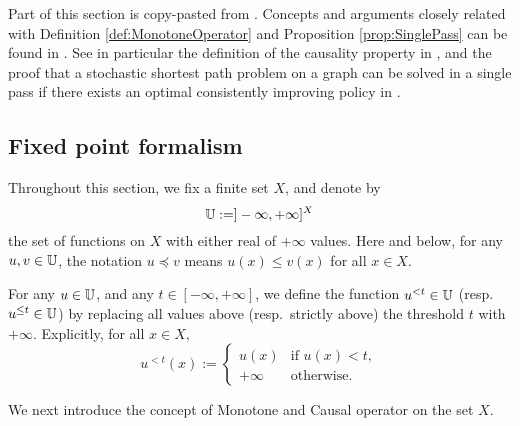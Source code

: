 
Part of this section is copy-pasted from \cite[Appendix A]{mirebeau2019riemannian}.
Concepts and arguments closely related with Definition \ref{def:MonotoneOperator} and Proposition \ref{prop:SinglePass} can be found in \cite{Tsitsiklis:1995EfficientTrajectories, Kimmel:1998Manifold,Sethian2003OUM,bertsekas1995dynamic}. See in particular the definition of the causality property in \cite{Sethian2003OUM}, and the proof that a stochastic shortest path problem on a graph can be solved in a single pass if there exists an optimal consistently improving policy in \cite[chapter 2]{bertsekas1995dynamic}.


\subsection{Fixed point formalism}

Throughout this section, we fix a finite set $X$, and denote by
\begin{equation*}
	\mathbb{U} := ]-\infty,+\infty]^X
\end{equation*}
the set of functions on $X$ with either real of $+\infty$ values. Here and below, for any $u,v \in \mathbb{U}$, the notation $u \preceq v$ means $u(x) \leq v(x)$ for all $x \in X$.


For any $u \in \mathbb{U}$, and any $t \in [-\infty,+\infty]$, we define  the function $u^{<t} \in \mathbb{U}$ (resp. $u^{\leq t} \in \mathbb{U}$) by replacing all values above (resp.\ strictly above) the threshold $t$ with $+\infty$. Explicitly, for all $x \in X$, 
\begin{equation*}
	u^{<t}(x) := 
	\begin{cases}
		u(x) &\text{if } u(x) < t,\\
		+\infty &\text{otherwise}.
	\end{cases}
\end{equation*}


We next introduce the concept of Monotone and Causal operator on the set $X$. 

